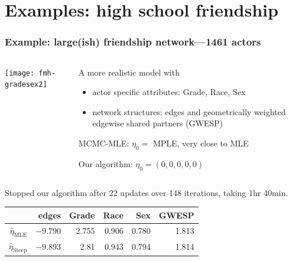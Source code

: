 \documentclass[ 10pt]{beamer}
\newcommand{\etaMLE}{\hat{\eta}_{\textrm{MLE}}}
\begin{document}
\section{Examples: high school friendship}

\frame
{
  \frametitle{Example: large(ish) friendship network---1461 actors}  
\begin{columns}[t]
\begin{column}[T]{0.3\textwidth}
\texttt{[image: fmh-gradesex2]}
\end{column}

\begin{column}[T]{0.7\textwidth}
A more realistic model with
\vspace{1mm}
\begin{itemize}
\item actor specific attributes: Grade, Race, Sex
\vspace{1mm}

\item network structures: edges and geometrically weighted edgewise shared partners (GWESP)
\vspace{5mm}
\end{itemize}

MCMC-MLE:  \hspace{1mm} $\eta_0 = $ MPLE, very close to MLE

Our algorithm: $\eta_0 = (0,0,0,0,0)$
\end{column}
\end{columns}
\vspace{5mm}

\pause
Stopped our algorithm after 22 updates over 148 iterations, taking 1hr 40min.
\begin{table}
\begin{center} 
\begin{tabular}{rrrrrr}
  \hline
 & edges & Grade & Race & Sex & GWESP \\ 
  \hline
$\etaMLE$ & $-9.790$ & 2.755 & 0.906 & 0.780 & 1.813 \\ 
$\hat{\eta}_{\textrm{Steep}}$ & 	$-9.893$	&	2.81	&	0.943	&	0.794	&	1.814\\ 
   \hline
\end{tabular}\label{T:FauxMagnolia}
\end{center}
\end{table}
}
\end{document}
